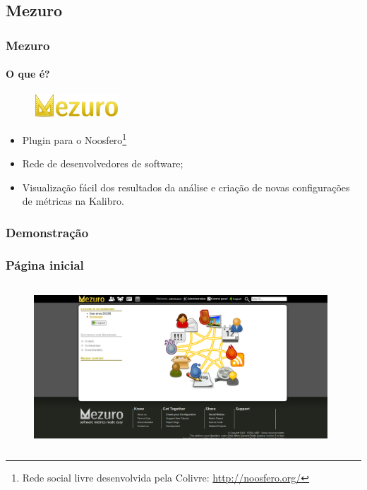 \documentclass{beamer}
\begin{document}
  \subsection{Mezuro}
  
  \begin{frame}
    \frametitle{Mezuro}
    \framesubtitle{O que é?}
    
    \begin{figure}
      \begin{flushleft}
        \includegraphics{images/logo-mezuro.png}
        \label{fig:logo-mezuro}
      \end{flushleft}
    \end{figure}
    
    \begin{itemize}
      \item Plugin para o Noosfero\footnote{Rede social livre desenvolvida pela Colivre: \url{http://noosfero.org/}}
      \item Rede de desenvolvedores de software;
      \item Visualização fácil dos resultados da análise e criação de novas configurações de métricas na Kalibro.
    \end{itemize}
  
  \end{frame}
  
  \subsubsection{Demonstração}
  
    \begin{frame}
      \frametitle{Página inicial}
      \framesubtitle{}
      
      \begin{figure}
        \begin{center}
          \includegraphics[width=11cm, height=6cm]{images/00-home.png}
          \label{fig:home}
        \end{center}
      \end{figure}
    
    \end{frame}
    
\end{document}
